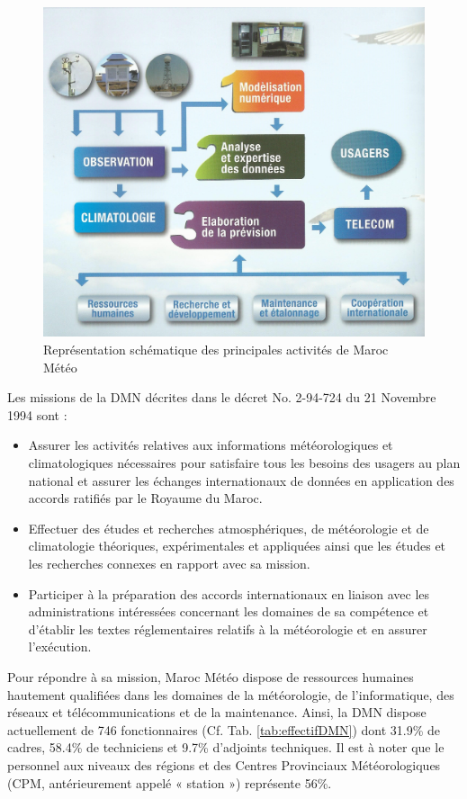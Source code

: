 \begin{figure}[!h]
\centering
\includegraphics[width=10 cm, height= 7 cm]{img/DMN.jpeg}
\caption{Représentation schématique des principales activités de Maroc Météo}
\label{fig:MissionDMN}
\end{figure}

Les missions de la DMN décrites dans le décret No. 2-94-724 du 21 Novembre 1994 sont :
\begin{itemize}
\item[\ding{224}] Assurer les activités relatives aux
informations météorologiques et
climatologiques nécessaires pour satisfaire tous les besoins des usagers au plan national et assurer les échanges internationaux de données en application des
accords ratifiés par le Royaume du Maroc.
\item[\ding{224}] Effectuer des études et recherches atmosphériques, de météorologie et de
climatologie théoriques, expérimentales et appliquées ainsi que les études et les recherches connexes en rapport avec sa mission.
\item[\ding{224}] Participer à la préparation des accords internationaux en liaison avec les administrations intéressées concernant les domaines de sa compétence et
d’établir les textes réglementaires relatifs à la météorologie et en assurer l’exécution.\\
\end{itemize}
 
 Pour répondre à sa mission, Maroc Météo dispose de ressources humaines hautement qualifiées dans les domaines de la météorologie, de l'informatique, des réseaux et télécommunications et de la maintenance. Ainsi, la DMN dispose actuellement de 746 fonctionnaires (Cf. Tab. \ref{tab:effectifDMN}) dont 31.9\% de cadres, 58.4\% de techniciens et 9.7\% d’adjoints techniques. Il est à noter que le personnel aux niveaux des régions et des Centres Provinciaux Météorologiques (CPM, antérieurement appelé « station ») représente 56\%.\\

